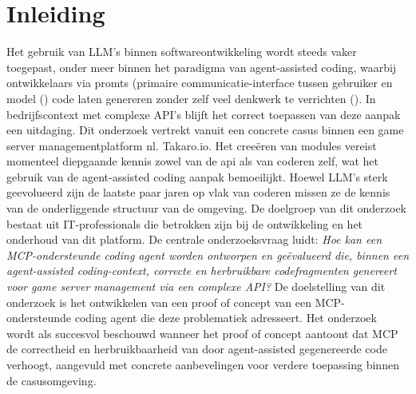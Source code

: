 


% 

\section{Inleiding}%
\label{sec:inleiding}
Het gebruik van LLM’s binnen softwareontwikkeling wordt steeds vaker toegepast, onder meer binnen het paradigma van agent-assisted coding, waarbij ontwikkelaars via promts (primaire communicatie-interface tussen gebruiker en model (\cite{zhou2025prompt}) code laten genereren zonder  zelf veel denkwerk te verrichten  (\cite{google2025vibecoding}). In bedrijfscontext met complexe API’s blijft het correct toepassen van deze aanpak een uitdaging. Dit onderzoek vertrekt vanuit een concrete casus binnen een game server managementplatform nl. Takaro.io. Het creeëren van modules vereist momenteel diepgaande kennis zowel van de api als van coderen zelf, wat het gebruik van de agent-assisted coding aanpak bemoeilijkt. Hoewel LLM’s sterk geevolueerd zijn de laatste paar jaren op vlak van coderen missen ze de kennis van de onderliggende structuur van de omgeving. 
De doelgroep van dit onderzoek bestaat uit IT-professionals die betrokken zijn bij de ontwikkeling en het onderhoud van dit platform. De centrale onderzoeksvraag luidt:
\textit{Hoe kan een MCP-ondersteunde coding agent worden ontworpen en geëvalueerd die, binnen een agent-assisted coding-context, correcte en herbruikbare codefragmenten genereert voor game server management via een complexe API?}  
De doelstelling van dit onderzoek is het ontwikkelen van een proof of concept van een MCP-ondersteunde coding agent die deze problematiek adresseert. Het onderzoek wordt als succesvol beschouwd wanneer het proof of concept aantoont dat MCP de correctheid en herbruikbaarheid van door agent-assisted gegenereerde code verhoogt, aangevuld met concrete aanbevelingen voor verdere toepassing binnen de casusomgeving.

